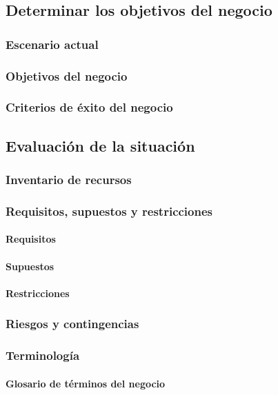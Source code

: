 \subsection{Determinar los objetivos del negocio}
    \subsubsection{Escenario actual}
    \subsubsection{Objetivos del negocio}
    \subsubsection{Criterios de éxito del negocio}
\subsection{Evaluación de la situación}
    \subsubsection{Inventario de recursos}
    \subsubsection{Requisitos, supuestos y restricciones}
        \paragraph{Requisitos}
        \paragraph{Supuestos}
        \paragraph{Restricciones}
    \subsubsection{Riesgos y contingencias}
    \subsubsection{Terminología}
        \paragraph{Glosario de términos del negocio}
